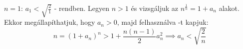    $n=1$: $a_{1}<\sqrt{\frac{2}{1}}$ - rendben. Legyen $n>1$ és 
   vizsgáljuk az ${n}^{\frac{1}{n}}=1+a_{n}$ alakot. Ekkor megállapíthatjuk, hogy 
   $a_{n}>0$, majd felhasználva -t kapjuk:
   $$
      n = {(1+a_{n})}^{n}> 1+\frac{n(n-1)}{2}a_{n}^{2} \implies 
      a_{n}< \sqrt{\frac{2}{n}}
   $$
